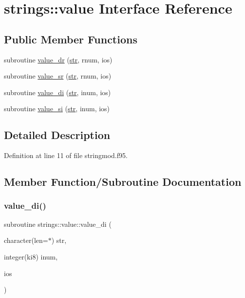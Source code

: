 \hypertarget{interfacestrings_1_1value}{}\section{strings\+:\+:value Interface Reference}
\label{interfacestrings_1_1value}
\subsection*{Public Member Functions}
\begin{DoxyCompactItemize}
\item 
subroutine \hyperlink{interfacestrings_1_1value_a8c03ca7c04583872ec5501088bea2e5b}{value\+\_\+dr} (\hyperlink{_s_o_l_w_e_i_g__misc_8f95_a77a2ca74046c88062aa8333bf1eaca05}{str}, rnum, ios)
\item 
subroutine \hyperlink{interfacestrings_1_1value_a5e6f162c9e02b46a92d20e9e65c9fc36}{value\+\_\+sr} (\hyperlink{_s_o_l_w_e_i_g__misc_8f95_a77a2ca74046c88062aa8333bf1eaca05}{str}, rnum, ios)
\item 
subroutine \hyperlink{interfacestrings_1_1value_ac548c5842293d23f557f4cdb4ae1c7a0}{value\+\_\+di} (\hyperlink{_s_o_l_w_e_i_g__misc_8f95_a77a2ca74046c88062aa8333bf1eaca05}{str}, inum, ios)
\item 
subroutine \hyperlink{interfacestrings_1_1value_a702d7223cac0986148075c7e9c889fb8}{value\+\_\+si} (\hyperlink{_s_o_l_w_e_i_g__misc_8f95_a77a2ca74046c88062aa8333bf1eaca05}{str}, inum, ios)
\end{DoxyCompactItemize}


\subsection{Detailed Description}


Definition at line 11 of file stringmod.\+f95.



\subsection{Member Function/\+Subroutine Documentation}
\mbox{\label{interfacestrings_1_1value_ac548c5842293d23f557f4cdb4ae1c7a0}} 
\subsubsection{\texorpdfstring{value\+\_\+di()}{value\_di()}}
{\footnotesize\ttfamily subroutine strings\+::value\+::value\+\_\+di (\begin{DoxyParamCaption}\item[{character(len=$\ast$)}]{str,  }\item[{integer(ki8)}]{inum,  }\item[{}]{ios }\end{DoxyParamCaption})}



